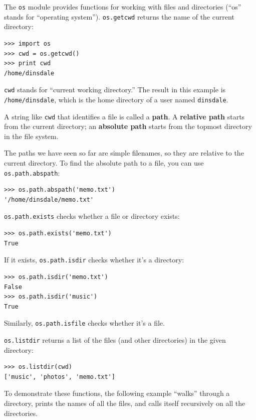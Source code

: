 \documentclass[10pt]{book}
\begin{document}
{The {\tt os} module provides functions for working with files and
directories (``os'' stands for ``operating system'').  {\tt os.getcwd}
returns the name of the current directory:


\beforeverb
\begin{verbatim}
>>> import os
>>> cwd = os.getcwd()
>>> print cwd
/home/dinsdale
\end{verbatim}
\afterverb
%
{\tt cwd} stands for ``current working directory.''  The result in
this example is {\tt /home/dinsdale}, which is the home directory of a
user named {\tt dinsdale}.


A string like {\tt cwd} that identifies a file is called a {\bf path}.
A {\bf relative path} starts from the current directory;
an {\bf absolute path} starts from the topmost directory in the
file system.


The paths we have seen so far are simple filenames, so they are
relative to the current directory.  To find the absolute path to
a file, you can use {\tt os.path.abspath}:

\beforeverb
\begin{verbatim}
>>> os.path.abspath('memo.txt')
'/home/dinsdale/memo.txt'
\end{verbatim}
\afterverb
%
{\tt os.path.exists} checks
whether a file or directory exists:


\beforeverb
\begin{verbatim}
>>> os.path.exists('memo.txt')
True
\end{verbatim}
\afterverb
%
If it exists, {\tt os.path.isdir} checks whether it's a directory:

\beforeverb
\begin{verbatim}
>>> os.path.isdir('memo.txt')
False
>>> os.path.isdir('music')
True
\end{verbatim}
\afterverb
%
Similarly, {\tt os.path.isfile} checks whether it's a file.

{\tt os.listdir} returns a list of the files (and other directories)
in the given directory:

\beforeverb
\begin{verbatim}
>>> os.listdir(cwd)
['music', 'photos', 'memo.txt']
\end{verbatim}
\afterverb
%
To demonstrate these functions, the following example
``walks'' through a directory, prints
the names of all the files, and calls itself recursively on
all the directories.

}
\end{document}
